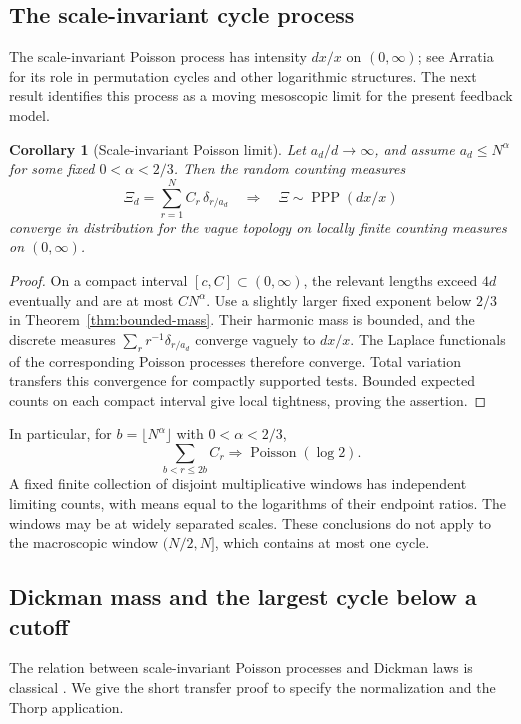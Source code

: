 \documentclass[11pt]{article}
\newtheorem{corollary}[theorem]{Corollary}
\theoremstyle{remark}
\begin{document}
\subsection{The scale-invariant cycle process}
The scale-invariant Poisson process has intensity $dx/x$ on
$(0,\infty)$; see Arratia~\cite{Arratia} for its role in permutation
cycles and other logarithmic structures. The next result identifies this
process as a moving mesoscopic limit for the present feedback model.

\begin{corollary}[Scale-invariant Poisson limit]\label{cor:scale-poisson}
Let $a_d/d\to\infty$, and assume $a_d\le N^\alpha$ for some fixed
$0<\alpha<2/3$. Then the random counting measures
\[
 \Xi_d=\sum_{r=1}^N C_r\,\delta_{r/a_d}
 \quad\Longrightarrow\quad
 \Xi\sim\operatorname{PPP}(dx/x)
 \tag{10.4}\label{eq:10.4}
\]
converge in distribution for the vague topology on locally finite counting
measures on $(0,\infty)$.
\end{corollary}
\begin{proof}
On a compact interval $[c,C]\subset(0,\infty)$, the relevant lengths
exceed $4d$ eventually and are at most $CN^\alpha$. Use a slightly larger
fixed exponent below $2/3$ in Theorem~\ref{thm:bounded-mass}. Their harmonic
mass is bounded, and the discrete measures
$\sum_r r^{-1}\delta_{r/a_d}$ converge vaguely to $dx/x$.
The Laplace functionals of the corresponding Poisson processes therefore
converge. Total variation transfers this convergence for compactly
supported tests. Bounded expected counts on each compact interval give
local tightness, proving the assertion.
\end{proof}

In particular, for $b=\lfloor N^\alpha\rfloor$ with $0<\alpha<2/3$,
\[
 \sum_{b<r\le2b}C_r\Longrightarrow\operatorname{Poisson}(\log2).
\]
A fixed finite collection of disjoint multiplicative windows has independent
limiting counts, with means equal to the logarithms of their endpoint ratios.
The windows may be at widely separated scales. These conclusions do not
apply to the macroscopic window $(N/2,N]$, which contains at most one cycle.

\subsection{Dickman mass and the largest cycle below a cutoff}
The relation between scale-invariant Poisson processes and Dickman laws is
classical \cite{Arratia,BM}. We give the short transfer proof to specify the
normalization and the Thorp application.
\end{document}

